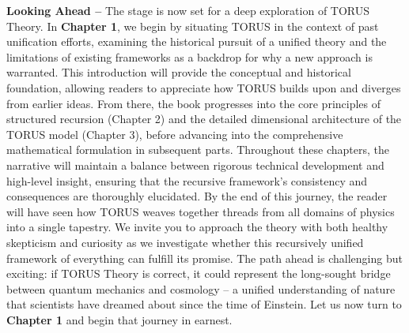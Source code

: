 \documentclass[
]{article}
\begin{document}
\textbf{Looking Ahead --} The stage is now set for a deep exploration of
TORUS Theory. In \textbf{Chapter 1}, we begin by situating TORUS in the
context of past unification efforts, examining the historical pursuit of
a unified theory and the limitations of existing frameworks as a
backdrop for why a new approach is warranted. This introduction will
provide the conceptual and historical foundation, allowing readers to
appreciate how TORUS builds upon and diverges from earlier ideas. From
there, the book progresses into the core principles of structured
recursion (Chapter 2) and the detailed dimensional architecture of the
TORUS model (Chapter 3), before advancing into the comprehensive
mathematical formulation in subsequent parts. Throughout these chapters,
the narrative will maintain a balance between rigorous technical
development and high-level insight, ensuring that the recursive
framework's consistency and consequences are thoroughly elucidated. By
the end of this journey, the reader will have seen how TORUS weaves
together threads from all domains of physics into a single tapestry. We
invite you to approach the theory with both healthy skepticism and
curiosity as we investigate whether this recursively unified framework
of everything can fulfill its promise. The path ahead is challenging but
exciting: if TORUS Theory is correct, it could represent the long-sought
bridge between quantum mechanics and cosmology -- a unified
understanding of nature that scientists have dreamed about since the
time of Einstein. Let us now turn to \textbf{Chapter 1} and begin that
journey in earnest.
\end{document}
